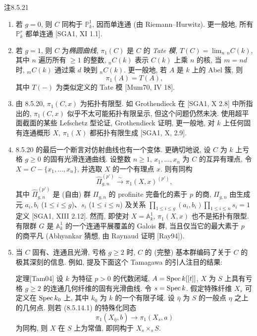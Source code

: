 \begin{origstatement}{注}{8.5.21}\label{ch08:rem8521}
\begin{enumerate}
\item[(a)] 若 $g=0$, 则 $C$ 同构于 $\mathbb P_k^1$, 因而单连通 (由 Riemann--Hurwitz). 更一般地, 所有 $\mathbb P_k^r$ 都单连通 [SGA1, XI 1.1].
\item[(b)] 若 $g=1$, 则 $C$ 为\emph{椭圆曲线}, $\pi_1(C)$ 是 $C$ 的 \emph{Tate 模}, $T(C)=\lim_n{}_nC(k)$, 其中 $n$ 遍历所有 $\geq1$ 的整数, ${}_nC(k)$ 表示 $C(k)$ 上乘 $n$ 的核, 当 $m=nd$ 时, ${}_mC(k)$ 通过乘 $d$ 映到 ${}_nC(k)$. 更一般地, 若 $A$ 是 $k$ 上的 Abel 簇, 则
\[\pi_1(A)=T(A),\]
其中 $T(-)$ 为类似定义的 Tate 模 [Mum70, IV 18].
\item[(c)] 由 8.5.20, $\pi_1(C,x)$ 为拓扑有限型. 如 Grothendieck 在 [SGA1, X 2.8] 中所指出的, $\pi_1(C,x)$ 似乎不太可能拓扑有限呈示, 但这个问题仍然未决. 使用超平面截面的某些 Lefschetz 型论证, Grothendieck 证明, 更一般地, 对 $k$ 上任何固有连通概形 $X$, $\pi_1(X)$ 都拓扑有限生成 [SGA1, X, 2.9].
\item[(d)] 8.5.20 的最后一个断言对仿射曲线也有一个变体. 更确切地说, 设 $C$ 为 $k$ 上亏格 $g\geq0$ 的固有光滑连通曲线. 设整数 $n\geq1$, $x_1,\ldots,x_n$ 为 $C$ 的互异有理点, 令 $X=C-\{x_1,\ldots,x_n\}$, 并选取 $X$ 的一个有理点 $x$. 则有同构
\[\widehat\Pi_{g,n}^{(p')}\xrightarrow\sim\pi_1(X,x)^{(p')},\]
其中 $\widehat\Pi_{g,n}^{(p')}$ 是 (自由) 群 $\Pi_{g,n}$ 的 profinite 完备化的素于 $p$ 的商, $\Pi_{g,n}$ 由生成元 $a_i,b_i$ ($1\leq i\leq g$)、$s_i$ ($1\leq i\leq n$) 及关系 $\prod_{1\leq i\leq g}(a_i,b_i)\prod_{1\leq i\leq n}s_i=1$ 定义 [SGA1, XIII 2.12]. 然而, 即使对 $X=\mathbb A_k^1$, $\pi_1(X,x)$ 也不是拓扑有限型. 有限群 $G$ 是 $\mathbb A_k^1$ 的一个连通平展覆盖的 Galois 群, 当且仅当它的最大素于 $p$ 的商平凡 (Abhyankar 猜想, 由 Raynaud 证明 [Ray94]).
\item[(e)] 当 $C$ 固有、连通且光滑, 亏格 $g\geq2$ 时, $C$ 的 (完整) 基本群编码了关于 $C$ 的极其深刻的信息. 例如, 提及下面这个 Tamagawa 的引人注目的结果:
\begin{origstatement}{定理}{[Tam04]}
设 $k$ 为特征 $p>0$ 的代数闭域, $A=\operatorname{Spec} k[[t]]$, $X$ 为 $S$ 上具有亏格 $g\geq2$ 的连通几何纤维的固有光滑曲线. 令 $s=\operatorname{Spec} k$. 假定特殊纤维 $X_s$ 可定义在 $\operatorname{Spec} k_0$ 上, 其中 $k_0$ 为 $k$ 的一个有限子域. 设 $\bar\eta$ 为 $S$ 的一般点 $\eta$ 之上的几何点. 则若 (8.5.14.1) 的特殊化同态
\[\pi_1(X_{\bar\eta},b)\longrightarrow\pi_1(X_s,a)\]
为同构, 则 $X$ 在 $S$ 上为常值, 即同构于 $X_s\times_sS$.
\end{origstatement}
\end{enumerate}
\end{origstatement}

